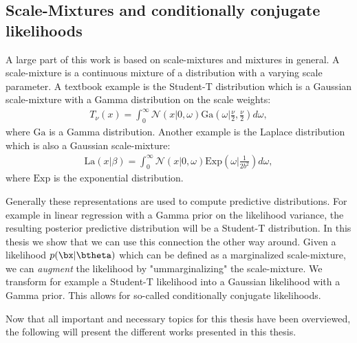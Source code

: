 \subsection{Scale-Mixtures and conditionally conjugate likelihoods}
\label{sec:scale-mixtures}
A large part of this work is based on scale-mixtures and mixtures in general.
A scale-mixture is a continuous mixture of a distribution with a varying scale parameter.
A textbook example is the Student-T distribution which is a Gaussian scale-mixture with a Gamma distribution on the scale weights:
\begin{align*}
    T_\nu(x) = \int_{0}^\infty \mathcal{N}\left(x|0,\omega\right)\mathrm{Ga}\left(\omega|\frac{\nu}{2}, \frac{\nu}{2}\right)d\omega,
\end{align*}
where $\mathrm{Ga}$ is a Gamma distribution.
Another example is the Laplace distribution which is also a Gaussian scale-mixture:
\begin{align*}
    \mathrm{La}(x|\beta) = \int_0^{\infty} \mathcal{N}(x|0,\omega)\mathrm{Exp}\left(\omega|\frac{1}{2b^2}\right)d\omega,
\end{align*}
where $\mathrm{Exp}$ is the exponential distribution.

Generally these representations are used to compute predictive distributions.
For example in linear regression with a Gamma prior on the likelihood variance, the resulting posterior predictive distribution will be a Student-T distribution.
In this thesis we show that we can use this connection the other way around.
Given a likelihood $p(\bx|\btheta)$ which can be defined as a marginalized scale-mixture,
we can \textit{augment} the likelihood by "ummarginalizing" the scale-mixture.
We transform for example a Student-T likelihood into a Gaussian likelihood with a Gamma prior.
This allows for so-called conditionally conjugate likelihoods.


Now that all important and necessary topics for this thesis have been overviewed, the following will present the different works presented in this thesis. 
